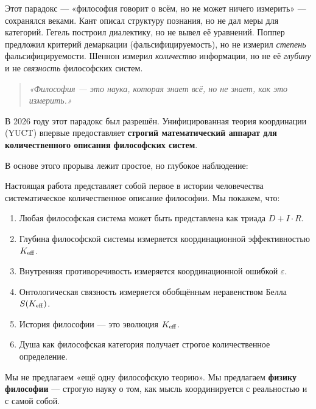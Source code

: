 \documentclass[12pt,a4paper]{article}
\newcommand{\eps}{\varepsilon}
\begin{document}
	Этот парадокс — «философия говорит о всём, но не может ничего измерить» — сохранялся веками. Кант описал структуру познания, но не дал меры для категорий. Гегель построил диалектику, но не вывел её уравнений. Поппер предложил критерий демаркации (фальсифицируемость), но не измерил \emph{степень} фальсифицируемости. Шеннон измерил \emph{количество} информации, но не её \emph{глубину} и не \emph{связность} философских систем.
	
	\begin{quote}
		\textit{«Философия — это наука, которая знает всё, но не знает, как это измерить.»}
	\end{quote}
	
	В 2026 году этот парадокс был разрешён. Унифицированная теория координации (YUCT) впервые предоставляет \textbf{строгий математический аппарат для количественного описания философских систем}.
	
	В основе этого прорыва лежит простое, но глубокое наблюдение:
	
	\begin{center}
	\end{center}
	
	Настоящая работа представляет собой первое в истории человечества систематическое количественное описание философии. Мы покажем, что:
	
	\begin{enumerate}
		\item Любая философская система может быть представлена как триада \(D + I \cdot R\).
		\item Глубина философской системы измеряется координационной эффективностью \(\Keff\).
		\item Внутренняя противоречивость измеряется координационной ошибкой \(\eps\).
		\item Онтологическая связность измеряется обобщённым неравенством Белла \(S(\Keff)\).
		\item История философии — это эволюция \(\Keff\).
		\item Душа как философская категория получает строгое количественное определение.
	\end{enumerate}
	
	Мы не предлагаем «ещё одну философскую теорию». Мы предлагаем \textbf{физику философии} — строгую науку о том, как мысль координируется с реальностью и с самой собой.
	
\end{document}
